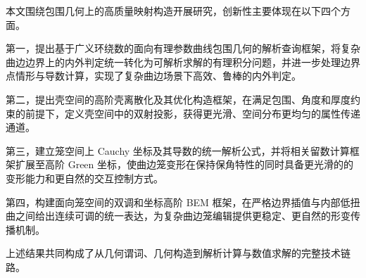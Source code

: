 
\begin{innovations}

本文围绕包围几何上的高质量映射构造开展研究，创新性主要体现在以下四个方面。

第一，提出基于广义环绕数的面向有理参数曲线包围几何的解析查询框架，将复杂曲边边界上的内外判定统一转化为可解析求解的有理积分问题，并进一步处理边界点情形与导数计算，实现了复杂曲边场景下高效、鲁棒的内外判定。

第二，提出壳空间的高阶壳离散化及其优化构造框架，在满足包围、角度和厚度约束的前提下，定义壳空间中的双射投影，获得更光滑、空间分布更均匀的属性传递通道。

第三，建立笼空间上 Cauchy 坐标及其导数的统一解析公式，并将相关留数计算框架扩展至高阶 Green 坐标，使曲边笼变形在保持保角特性的同时具备更光滑的的变形能力和更自然的交互控制方式。

第四，构建面向笼空间的双调和坐标高阶 BEM 框架，在严格边界插值与内部低扭曲之间给出连续可调的统一表达，为复杂曲边笼编辑提供更稳定、更自然的形变传播机制。

上述结果共同构成了从几何谓词、几何构造到解析计算与数值求解的完整技术链路。
\end{innovations}
